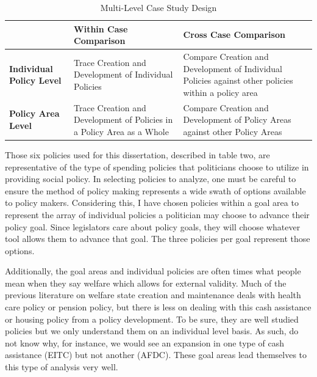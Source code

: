\documentclass[12pt]{article}
\begin{document}
\begin{table}
\centering
    \begin{tabularx}{\textwidth}{XXX} \toprule
           & \textbf{Within Case Comparison} & \textbf{Cross Case Comparison                                                                              } \\ \midrule
    \textbf{Individual Policy Level} & Trace Creation and Development of Individual Policies        & Compare Creation and Development of Individual Policies against other policies within a policy area \\
    \textbf{Policy Area Level}       & Trace Creation and Development of Policies in a Policy Area as a Whole & Compare Creation and Development of Policy Areas against other Policy Areas                         \\ \bottomrule
    \end{tabularx}
  \caption{Multi-Level Case Study Design}
  \label{tab:casestudy}
\end{table}

Those six policies used for this dissertation, described in table two, are representative of the type of spending policies that politicians choose to utilize in providing social policy. In selecting policies to analyze, one must be careful to ensure the method of policy making represents a wide swath of options available to policy makers. Considering this, I have chosen policies within a goal area to represent the array of individual policies a politician may choose to advance their policy goal. Since legislators care about policy goals, they will choose whatever tool allows them to advance that goal. The three policies per goal represent those options. 

Additionally, the goal areas and individual policies are often times what people mean when they say welfare which allows for external validity. Much of the previous literature on welfare state creation and maintenance deals with health care policy or pension policy, but there is less on dealing with this cash assistance or housing policy from a policy development. To be sure, they are well studied policies but we only understand them on an individual level basis. As such, do not know why, for instance, we would see an expansion in one type of cash assistance (EITC) but not another (AFDC). These goal areas lead themselves to this type of analysis very well.
\end{document}
